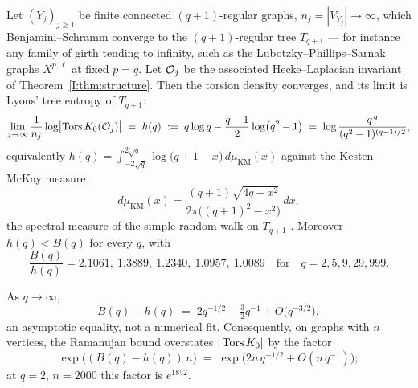 \begin{theorem}\label{I:thm:bstorsion}
Let $(Y_j)_{j\ge1}$ be finite connected $(q+1)$-regular graphs, $n_j=|V_{Y_j}|\to\infty$,
which Benjamini--Schramm converge to the $(q+1)$-regular tree $T_{q+1}$ --- for instance
any family of girth tending to infinity, such as the Lubotzky--Phillips--Sarnak graphs
$X^{p,\ell}$ at fixed $p=q$. Let $\mathcal{O}_j$ be the associated Hecke--Laplacian invariant of
Theorem~\ref{I:thm:structure}. Then the torsion density converges, and its limit is Lyons'
tree entropy of $T_{q+1}$:
\begin{equation}\label{I:eq:bslimit}
\lim_{j\to\infty}\frac1{n_j}\log\bigl|\operatorname{Tors} K_0(\mathcal{O}_j)\bigr|
\;=\;h(q)\;:=\;q\log q-\frac{q-1}{2}\log\bigl(q^2-1\bigr)
\;=\;\log\frac{q^{\,q}}{(q^2-1)^{(q-1)/2}} ,
\end{equation}
equivalently $h(q)=\int_{-2\sqrt q}^{2\sqrt q}\log\bigl(q+1-x\bigr)\,d\mu_{\mathrm{KM}}(x)$
against the Kesten--McKay measure
\[
d\mu_{\mathrm{KM}}(x)=\frac{(q+1)\sqrt{4q-x^2}}{2\pi\bigl((q+1)^2-x^2\bigr)}\,dx ,
\]
the spectral measure of the simple random walk on $T_{q+1}$ \cite{Kesten1959,McKay1981}.
Moreover $h(q)<B(q)$ for every $q$, with
\[
\frac{B(q)}{h(q)}=2.1061,\ 1.3889,\ 1.2340,\ 1.0957,\ 1.0089
\quad\text{for}\quad q=2,5,9,29,999.
\]
\end{theorem}

\begin{corollary}\label{I:cor:deficit}
As $q\to\infty$,
\begin{equation}\label{I:eq:deficit}
B(q)-h(q)\;=\;2q^{-1/2}-\tfrac32q^{-1}+O\bigl(q^{-3/2}\bigr) ,
\end{equation}
an asymptotic equality, not a numerical fit. Consequently, on graphs with $n$
vertices, the Ramanujan bound overstates $|\operatorname{Tors} K_0|$ by the factor
\[
\exp\bigl((B(q)-h(q))\,n\bigr)
\;=\;
\exp\bigl(2n\,q^{-1/2}+O(n\,q^{-1})\bigr) ;
\]
at $q=2$, $n=2000$ this factor is $e^{1852}$.
\end{corollary}

